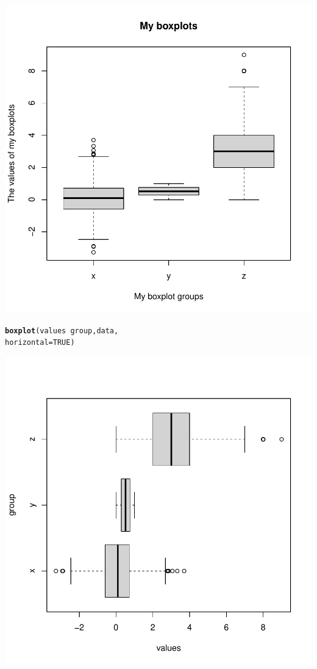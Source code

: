 \documentclass{article}\usepackage[]{graphicx}\usepackage[]{xcolor}
\makeatletter
\def\maxwidth{ %
  \ifdim\Gin@nat@width>\linewidth
    \linewidth
  \else
    \Gin@nat@width
  \fi
}
\newcommand{\hlnum}[1]{\textcolor[rgb]{0.686,0.059,0.569}{#1}}%
\newcommand{\hlopt}[1]{\textcolor[rgb]{0,0,0}{#1}}%
\newcommand{\hlstd}[1]{\textcolor[rgb]{0.345,0.345,0.345}{#1}}%
\newcommand{\hlkwc}[1]{\textcolor[rgb]{0.333,0.667,0.333}{#1}}%
\newcommand{\hlkwd}[1]{\textcolor[rgb]{0.737,0.353,0.396}{\textbf{#1}}}%
\newenvironment{kframe}{%
 \def\at@end@of@kframe{}%
 \ifinner\ifhmode%
  \def\at@end@of@kframe{\end{minipage}}%
  \begin{minipage}{\columnwidth}%
 \fi\fi%
 \def\FrameCommand##1{\hskip\@totalleftmargin \hskip-\fboxsep
 \colorbox{shadecolor}{##1}\hskip-\fboxsep
     \hskip-\linewidth \hskip-\@totalleftmargin \hskip\columnwidth}%
 \MakeFramed {\advance\hsize-\width
   \@totalleftmargin\z@ \linewidth\hsize
   \@setminipage}}%
 {\par\unskip\endMakeFramed%
 \at@end@of@kframe}
\newenvironment{knitrout}{}{} %
\makeatother
\begin{document}
\begin{knitrout}
{\centering \includegraphics[width=\maxwidth]{figure/unnamed-chunk-1-3} 

}


\begin{kframe}\begin{alltt}
\hlkwd{boxplot}\hlstd{(values} \hlopt{~} \hlstd{group, data,}
        \hlkwc{horizontal} \hlstd{=} \hlnum{TRUE}\hlstd{)}
\end{alltt}
\end{kframe}

{\centering \includegraphics[width=\maxwidth]{figure/unnamed-chunk-1-4} 

}
\end{knitrout}
\end{document}
